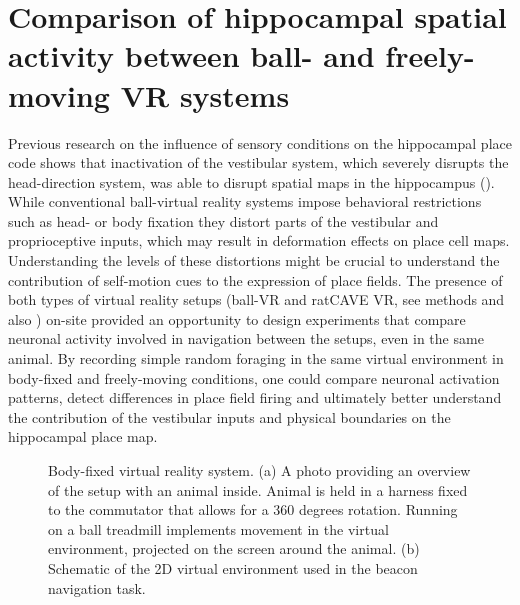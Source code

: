 \section{Comparison of hippocampal spatial activity between ball- and freely-moving VR systems}
\label{sec:comparison_ball_vr}

Previous research on the influence of sensory conditions on the hippocampal place code shows that inactivation of the vestibular system, which severely disrupts the head-direction system, was able to disrupt spatial maps in the hippocampus (\cite{Stackman2002}). While conventional ball-virtual reality systems impose behavioral restrictions such as head- or body fixation they distort parts of the vestibular and proprioceptive inputs, which may result in deformation effects on place cell maps. Understanding the levels of these distortions might be crucial to understand the contribution of self-motion cues to the expression of place fields. The presence of both types of virtual reality setups (ball-VR and ratCAVE VR, see methods and also \cite{Thurley2014}) on-site provided an opportunity to design experiments that compare neuronal activity involved in navigation between the setups, even in the same animal. By recording simple random foraging in the same virtual environment in body-fixed and freely-moving conditions, one could compare neuronal activation patterns, detect differences in place field firing and ultimately better understand the contribution of the vestibular inputs and physical boundaries on the hippocampal place map.

\begin{figure}
\captionsetup{format=plain}
\caption[ball VR]{
Body-fixed virtual reality system. (a) A photo providing an overview of the setup with an animal inside. Animal is held in a harness fixed to the commutator that allows for a 360 degrees rotation. Running on a ball treadmill implements movement in the virtual environment, projected on the screen around the animal. (b) Schematic of the 2D virtual environment used in the beacon navigation task.
}
\label{fig:F9_ball_VR}
\end{figure}


